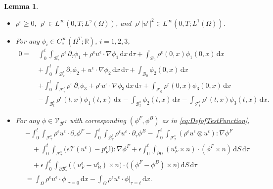 \documentclass[11pt,twoside,reqno]{amsart}
\numberwithin{equation}{section}
\numberwithin{figure}{section}
\newtheorem{lemma}{Lemma}[section]
\begin{document}
\begin{lemma}
\begin{itemize}
\item[3.] $\rho^\epsilon \ge 0$, $\ \rho^\epsilon \in L^\infty(0,T; L^\gamma(\Omega))$, and $\ \rho^\epsilon |u^\epsilon|^2 \in L^\infty(0,T; L^1(\Omega))$.

\item[4.] For any $\phi_i \in C_c^\infty(\Omega^T;\mathbb{R})$, $i=1,2,3$,
\begin{equation}\label{eq:DefofContinuityEquation}
\begin{aligned}
0 =\ &\int_0^t \!\!\int_{\mathcal{B}_\tau^\epsilon} \rho^\epsilon \,\partial_\tau \phi_1
+ \rho^\epsilon u^\epsilon \cdot \nabla \phi_1 \, \mathrm{d}x\,\mathrm{d}\tau
+ \int_{\mathcal{B}_0} \rho^\epsilon(0,x) \phi_1(0,x)\,\mathrm{d}x\\
&+ \int_0^t \!\!\int_{\mathcal{B}_\tau^\epsilon} \partial_\tau \phi_2
+ u^\epsilon \cdot \nabla \phi_2 \, \mathrm{d}x\,\mathrm{d}\tau
+ \int_{\mathcal{B}_0} \phi_2(0,x)\,\mathrm{d}x\\
&+ \int_0^t \!\!\int_{\mathcal{F}_\tau^\epsilon} \rho^\epsilon \,\partial_\tau \phi_3
+ \rho^\epsilon u^\epsilon \cdot \nabla \phi_3 \, \mathrm{d}x\,\mathrm{d}\tau
+ \int_{\mathcal{F}_0} \rho^\epsilon(0,x) \phi_3(0,x)\,\mathrm{d}x\\
&- \int_{\mathcal{B}_t^\epsilon} \rho^\epsilon(t,x) \phi_1(t,x)\,\mathrm{d}x
- \int_{\mathcal{B}_t^\epsilon} \phi_2(t,x)\,\mathrm{d}x
- \int_{\mathcal{F}_t^\epsilon} \rho^\epsilon(t,x) \phi_3(t,x)\,\mathrm{d}x.
\end{aligned}
\end{equation}

\item[5.] For any $\phi \in \mathcal{V}_{\mathcal{B}^{\epsilon T}}$ with corresponding $(\phi^F,\phi^B)$ as in \eqref{eq:DefofTestFunction},
\begin{equation}\label{eq:ViscousMomentumEstimates}
\begin{aligned}
&- \int_0^t \!\!\int_{\mathcal{F}_\tau^\epsilon} \rho^\epsilon u^\epsilon \cdot \partial_\tau \phi^F
  - \int_0^t \!\!\int_{\mathcal{B}_\tau^\epsilon} \rho^\epsilon u^\epsilon \cdot \partial_\tau \phi^B
  - \int_0^t \!\!\int_{\mathcal{F}_\tau^\epsilon} (\rho^\epsilon u^\epsilon \otimes u^\epsilon) : \nabla \phi^F \\
&\quad + \int_0^t \!\!\int_{\mathcal{F}_\tau^\epsilon} \big( \epsilon \mathcal{T}(u^\epsilon) - p_F^\epsilon \mathbb{I} \big) : \nabla \phi^F
  + \epsilon \int_0^t \!\!\int_{\partial \Omega} (u_F^\epsilon \times n)\cdot (\phi^F \times n) \, \mathrm{d}S\,\mathrm{d}\tau \\
&\quad + \epsilon \int_0^t \!\!\int_{\partial \mathcal{B}_\tau^\epsilon}
          \big( (u_F^\epsilon - u_B^\epsilon)\times n \big)\cdot \big( (\phi^F - \phi^B)\times n \big)\, \mathrm{d}S\,\mathrm{d}\tau \\
&= \int_{\Omega} \rho^\epsilon u^\epsilon \cdot \phi \big|_{\tau=0}\, \mathrm{d}x
 - \int_{\Omega} \rho^\epsilon u^\epsilon \cdot \phi \big|_{\tau=t}\, \mathrm{d}x.
\end{aligned}
\end{equation}


\end{itemize}
\end{lemma}
\end{document}
